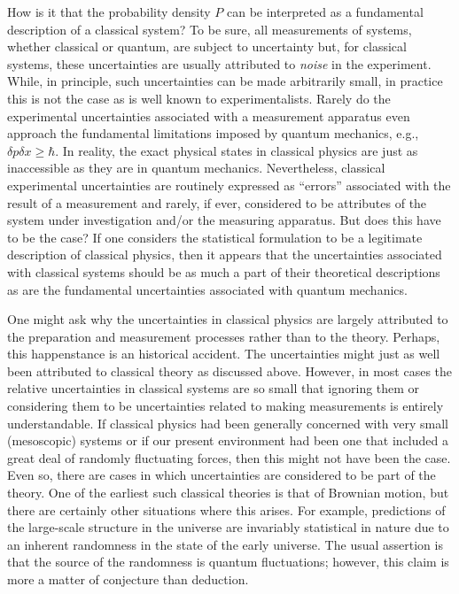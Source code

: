 \documentclass [12pt]{revtex4}
\begin{document}
How is it that the probability density $P$ can be interpreted as a
fundamental description of a classical system? To be sure, all
measurements of systems, whether classical or quantum, are subject
to uncertainty but, for classical systems, these uncertainties are usually attributed to
{\it noise} in the experiment.  While, in principle, such uncertainties
can be made arbitrarily small, in practice this is not the case as
is well known to experimentalists. Rarely do the
experimental uncertainties associated with a measurement apparatus
even approach the fundamental limitations imposed by quantum
mechanics, e.g., $\delta p \delta x \geq \hbar$. In reality, the
{exact} physical states in classical physics are just
as inaccessible as they are in quantum mechanics. Nevertheless,
classical experimental uncertainties are routinely expressed as
``errors'' associated with the result of a measurement and rarely,
if ever, considered to be attributes of the system under
investigation and/or the measuring apparatus. But does this have to
be the case? If one considers the statistical formulation to be a legitimate
description of classical physics, then it appears that the
uncertainties associated with classical systems
should be as much a part of their theoretical descriptions
as are the fundamental uncertainties associated with quantum
mechanics.

One might ask why the uncertainties in classical physics are largely
attributed to the preparation and measurement processes rather than
to the theory. Perhaps, this happenstance is an historical accident.
The uncertainties might just as well been attributed to classical
theory as discussed above. However, in most cases the relative
uncertainties in classical systems are so small that ignoring them
or considering them to be uncertainties related to making
measurements is entirely understandable. If classical physics had
been generally concerned with very small (mesoscopic) systems or if
our present environment had been one that included a great deal of
randomly fluctuating forces, then this might not have been the case.
Even so, there are cases in which uncertainties are considered to be
part of the theory. One of the earliest such classical theories is
that of Brownian motion, but there are certainly other situations
where this arises. For example, predictions of the large-scale
structure in the universe are invariably statistical in nature due
to an inherent randomness in the state of the early universe. The
usual assertion is that the source of the randomness is quantum
fluctuations; however, this claim is more a matter of conjecture
than deduction.
\end{document}
